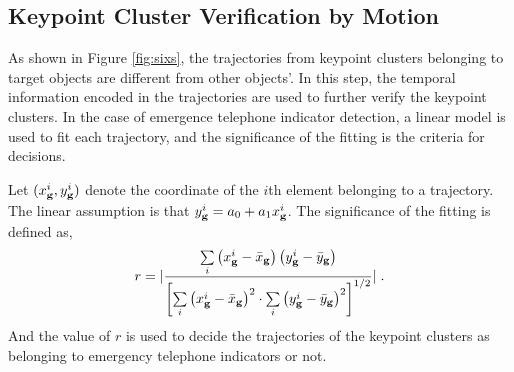 \subsection{Keypoint Cluster Verification by Motion}
As shown in Figure \ref{fig:sixs}, the trajectories from keypoint clusters belonging to target objects are different from other objects'. In this step, the temporal information encoded in the trajectories are used to further verify the keypoint clusters. In the case of emergence telephone indicator detection, a linear model is used to fit each trajectory, and the significance of the fitting is the criteria for decisions.

Let $(x^i_{\bf{g}},y^i_{\bf{g}})$ denote the coordinate of the $i$th element belonging to a trajectory. The linear assumption is that $y^i_{\bf{g}}=a_0+a_1{x^i_{\bf{g}}}$. The significance of the fitting is defined as,
\begin{equation}
r =| \frac{{\sum\limits_i {\left( {{x^i_{\bf{g}}} -  {\bar x_{\bf{g}}}} \right)\left( {{y^i_{\bf{g}}} -  {\bar y_{\bf{g}}}} \right)} }}{{{{\left[ {\sum\limits_i {{{\left( {{x^i_{\bf{g}}} -  {\bar x_{\bf{g}}}} \right)}^2} \cdot \sum\limits_i {{{\left( {{y^i_{\bf{g}}} -  {\bar y_{\bf{g}}}} \right)}^2}} } } \right]}^{1/2}}}}|\;.
\label{eq4}
\end{equation}
And the value of $r$ is used to decide the trajectories of the keypoint clusters as belonging to emergency telephone indicators or not.

